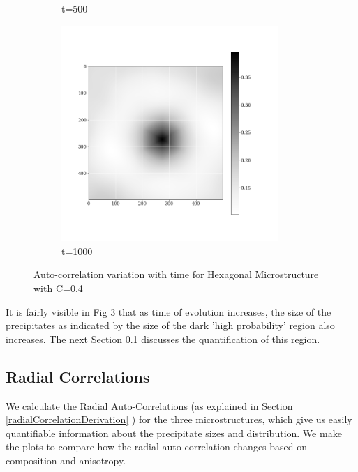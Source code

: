 \documentclass[12pt, a4paper]{report}
\begin{document}
\begin{figure}[H]
\begin{subfigure}{.32\textwidth}
  \caption{t=500}
  \label{img:microstrImg}
\end{subfigure}
\begin{subfigure}{.32\textwidth}
  \centering
  \includegraphics[width=0.9\textwidth]{Pictures/images9/hexTime/hex_image_04_960.png}
  \caption{t=1000}
  \label{img:microstrImg}
\end{subfigure}
\caption{Auto-correlation variation with time for Hexagonal Microstructure with C=0.4}
\label{fig:3HexaTime}
\end{figure}

It is fairly visible in Fig \ref{fig:3HexaTime} that as time of evolution increases, the size of the precipitates as indicated by the size of the dark 'high probability' region also increases. The next Section \ref{radialCorrelation} discusses the quantification of this region.





\subsection{Radial Correlations}
\label{radialCorrelation}
We calculate the Radial Auto-Correlations (as explained in Section  \ref{radialCorrelationDerivation} ) for the three microstructures, which give us easily quantifiable information about the precipitate sizes and distribution. We make the plots to compare how the radial auto-correlation changes based on composition and anisotropy. 
\end{document}
